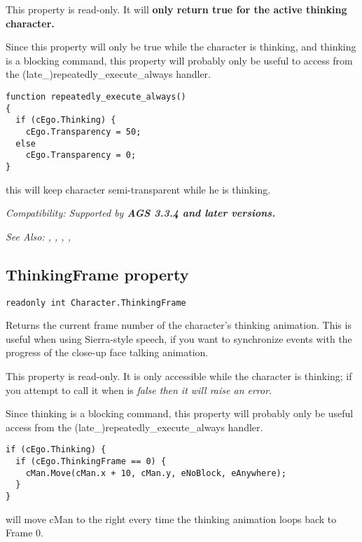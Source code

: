 This property is read-only. It will \bf{only} return true for the active thinking character.

Since this property will only be true while the character is thinking, and thinking is
a blocking command, this property will probably only be useful to access from
the (late_)repeatedly_execute_always handler.

\begin{verbatim}
function repeatedly_execute_always()
{
  if (cEgo.Thinking) {
    cEgo.Transparency = 50;
  else
    cEgo.Transparency = 0;
}
\end{verbatim}
this will keep character semi-transparent while he is thinking.

\it{Compatibility:} Supported by \bf{AGS 3.3.4} and later versions.

\it{See Also:} ,
,
,
,


\subsection{ThinkingFrame property}\label{Character.ThinkingFrame}%

\begin{verbatim}
readonly int Character.ThinkingFrame
\end{verbatim}
Returns the current frame number of the character's thinking animation. This is
useful when using Sierra-style speech, if you want to synchronize events with the
progress of the close-up face talking animation.

This property is read-only. It is only accessible while the character is thinking;
if you attempt to call it when  is
\it{false} then it will raise an error.

Since thinking is a blocking command, this property will probably only be useful
access from the (late_)repeatedly_execute_always handler.

\begin{verbatim}
if (cEgo.Thinking) {
  if (cEgo.ThinkingFrame == 0) {
    cMan.Move(cMan.x + 10, cMan.y, eNoBlock, eAnywhere);
  }
}
\end{verbatim}
will move cMan to the right every time the thinking animation loops back to Frame 0.

